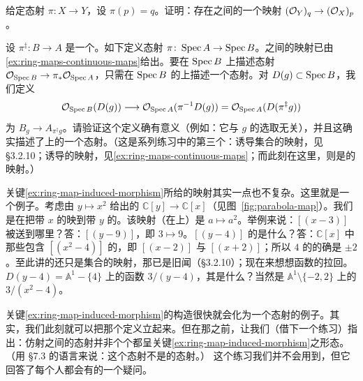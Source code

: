 \begin{exercise}[容易的重要练习]\label{ex:stalk-map-ringed-space}
给定\trRingedSpace{}态射 $\pi\colon X\to Y$，设 $\pi(p)=q$。证明：存在\trStalk{}之间的一个映射 $(\mathcal{O}_Y)_q\to(\mathcal{O}_X)_p$。
\end{exercise}

\begin{exercise}[关键练习]\label{ex:ring-map-induced-morphism}
设 $\pi^{\ddagger}\colon B\to A$ 是一个\trRingMorphism。如下定义\trRingedSpace{}态射 $\pi\colon\operatorname{Spec} A\to\operatorname{Spec} B$。\trTopologicalSpace{}之间的映射已由\cref{ex:ring-maps-continuous-maps}给出。要在 $\operatorname{Spec} B$ 上描述\trSheaf{}态射 $\mathcal{O}_{\operatorname{Spec} B}\to\pi_*\mathcal{O}_{\operatorname{Spec} A}$，只需在 $\operatorname{Spec} B$ 的\trDistinguishedBase{}上描述一个\trSheaf{}态射。对 $D(g)\subset\operatorname{Spec} B$，我们定义
\[
\mathcal{O}_{\operatorname{Spec} B}(D(g))\longrightarrow\mathcal{O}_{\operatorname{Spec} A}(\pi^{-1}D(g))=\mathcal{O}_{\operatorname{Spec} A}(D(\pi^{\ddagger}g))
\]
为 $B_g\to A_{\pi^{\ddagger}g}$。请验证这个定义确有意义（例如：它与 $g$ 的选取无关），并且这确实描述了\trDistinguishedBase{}上的一个\trSheaf{}态射。（这是系列练习中的第三个：\trRingMorphism{}诱导集合的映射，见 \S3.2.10；诱导\trTopologicalSpace{}的映射，见\cref{ex:ring-maps-continuous-maps}；而此刻在这里，则是\trRingedSpace{}的映射。）
\end{exercise}

关键\cref{ex:ring-map-induced-morphism}所给的\trRingedSpace{}映射其实一点也不复杂。这里就是一个例子。考虑由 $y\mapsto x^2$ 给出的\trRingMorphism{} $\mathbb{C}[y]\to\mathbb{C}[x]$（见图~\ref{fig:parabola-map}）。我们是在把带\trCoordinate{} $x$ 的\trAffineLine{}映到带\trCoordinate{} $y$ 的\trAffineLine。该映射（在\trClosedPoint{}上）是 $a\mapsto a^2$。举例来说：$[(x-3)]$ 被送到哪里？答：$[(y-9)]$，即 $3\mapsto 9$。$[(y-4)]$ 的\trInverseImage{}是什么？答：$\mathbb{C}[x]$ 中那些包含 $[(x^2-4)]$ 的\trPrimeIdeal，即 $[(x-2)]$ 与 $[(x+2)]$；所以 $4$ 的\trInverseImage{}的确是 $\pm2$。至此讲的还只是集合的映射，那已是旧闻（\S3.2.10）；现在来想想函数的拉回。$D(y-4)=\mathbb{A}^1-\{4\}$ 上的函数 $3/(y-4)$，其\trPullback{}是什么？当然是 $\mathbb{A}^1\setminus\{-2,2\}$ 上的 $3/(x^2-4)$。

关键\cref{ex:ring-map-induced-morphism}的构造很快就会化为一个\trScheme{}态射的例子。其实，我们此刻就可以把那个定义立起来。但在那之前，让我们（借下一个练习）指出：仿射\trScheme{}之间的\trRingedSpace{}态射并非个个都呈关键\cref{ex:ring-map-induced-morphism}之形态。（用 \S7.3 的语言来说：这个\trRingedSpace{}态射不是\trLocallyRingedSpace{}的态射。）%
这个练习我们并不会用到，但它回答了每个人都会有的一个疑问。


